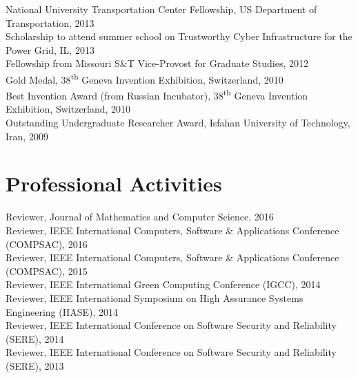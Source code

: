 \documentclass[10pt]{article}
\newlength{\Vspace}
\newlength{\Vspace}
\begin{document}
\begin{flushleft}

National University Transportation Center Fellowship, US Department of Transportation, 2013 \vspace{\Vspace} \\
Scholarship to attend summer school on Trustworthy Cyber Infrastructure for the Power Grid, IL, 2013 \vspace{\Vspace} \\
Fellowship from Missouri S\&T Vice-Provost for Graduate Studies, 2012 \vspace{\Vspace} \\
Gold Medal, 38\textsuperscript{th} Geneva Invention Exhibition, Switzerland, 2010 \vspace{\Vspace} \\
Best Invention Award (from Russian Incubator), 38\textsuperscript{th} Geneva Invention Exhibition, Switzerland, 2010 \vspace{\Vspace} \\
Outstanding Undergraduate Researcher Award, Isfahan University of Technology, Iran, 2009

\end{flushleft}

\ifResume
\else
\section{Professional Activities}
\begin{flushleft}
Reviewer, Journal of Mathematics and Computer Science, 2016 \vspace{\Vspace} \\
Reviewer, IEEE International Computers, Software \& Applications Conference (COMPSAC), 2016 \vspace{\Vspace} \\
Reviewer, IEEE International Computers, Software \& Applications Conference (COMPSAC), 2015 \vspace{\Vspace} \\
Reviewer, IEEE International Green Computing Conference (IGCC), 2014 \vspace{\Vspace} \\
Reviewer, IEEE International Symposium on High Assurance Systems Engineering (HASE), 2014 \vspace{\Vspace} \\
Reviewer, IEEE International Conference on Software Security and Reliability (SERE), 2014 \vspace{\Vspace} \\
Reviewer, IEEE International Conference on Software Security and Reliability (SERE), 2013
\end{flushleft}
\fi
\end{document}
